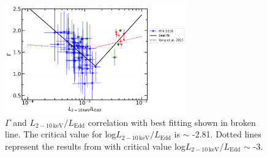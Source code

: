 \documentclass[twocolumn]{aastex63}
\begin{document}
\begin{figure}
\centering
	\includegraphics[width=0.7\textwidth]{./pic/xrayappendgood-errorbar-Lrate-g-tmap_brokenlinear_dot.png}
    \caption{$\Gamma$ and $L_\mathrm{2-10\,keV}/L_\mathrm{Edd}$ correlation with best fitting shown in broken line. The critical value for log$L_\mathrm{2-10\,keV}/L_\mathrm{Edd}$ is $\sim$ -2.81. Dotted lines represent the results from \citet{2015MNRAS.447.1692Y} with critical value log$L_\mathrm{2-10\,keV}/L_\mathrm{Edd}$ $\sim$ -3. }
    \label{fig:xrayappendgood-Lrateandg-tmap}
\end{figure}
\end{document}
